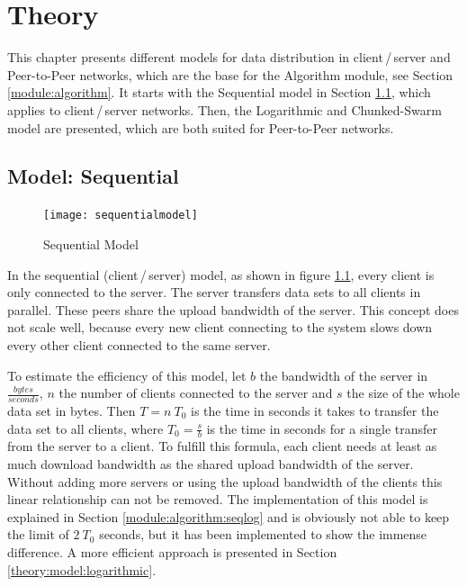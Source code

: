 
\chapter{Theory}
\label{theory}

This chapter presents different models for data distribution in client\,/\,server and Peer-to-Peer networks, which are the base for the Algorithm module, see Section \ref{module:algorithm}. It starts with the Sequential model in Section \ref{theory:model:sequential}, which applies to client\,/\,server networks. Then, the Logarithmic and Chunked-Swarm model are presented, which are both suited for Peer-to-Peer networks.

\section{Model: Sequential}
\label{theory:model:sequential}

\begin{figure}[ht]
	\centering
	\texttt{[image: sequentialmodel]}
	\caption{Sequential Model}
	\label{fig:sequentialmodel}
\end{figure}

In the sequential (client\,/\,server) model, as shown in figure \ref{fig:sequentialmodel}, every client is only connected to the server. The server transfers data sets to all clients in parallel. These peers share the upload bandwidth of the server. This concept does not scale well, because every new client connecting to the system slows down every other client connected to the same server. 

To estimate the efficiency of this model, let $b$ the bandwidth of the server in $\frac{bytes}{seconds}$, $n$ the number of clients connected to the server and $s$ the size of the whole data set in bytes. Then $T= n\:T_0$ is the time in seconds it takes to transfer the data set to all clients, where $T_0=\frac{s}{b}$ is the time in seconds for a single transfer from the server to a client. To fulfill this formula, each client needs at least as much download bandwidth as the shared upload bandwidth of the server. Without adding more servers or using the upload bandwidth of the clients this linear relationship can not be removed. The implementation of this model is explained in Section \ref{module:algorithm:seqlog} and is obviously not able to keep the limit of $2\:T_0$ seconds, but it has been implemented to show the immense difference. A more efficient approach is presented in Section \ref{theory:model:logarithmic}.


